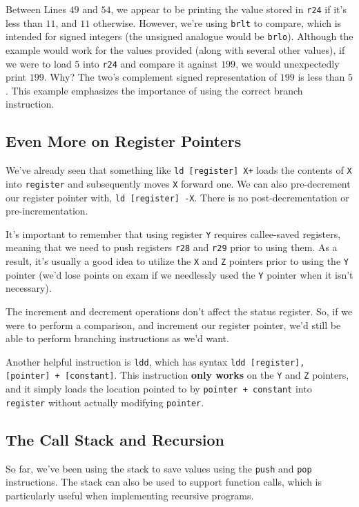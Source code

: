 Between Lines $49$ and $54$, we appear to be printing the value stored in \verb!r24! if it's less than $11$, and $11$ otherwise. However, we're using \verb!brlt! to compare, which is intended for signed integers (the unsigned analogue would be \verb!brlo!). Although the example would work for the values provided (along with several other values), if we were to load $5$ into \verb!r24! and compare it against $199$, we would unexpectedly print $199$. Why? The two's complement signed representation of $199$ is less than $5$. This example emphasizes the importance of using the correct branch instruction. 


\subsection{Even More on Register Pointers}

We've already seen that something like \verb!ld [register] X+! loads the contents of \verb!X! into \verb!register! and subsequently moves \verb!X! forward one. We can also pre-decrement our register pointer with, \verb!ld [register] -X!. There is no post-decrementation or pre-incrementation.

It's important to remember that using register \verb!Y! requires callee-saved registers, meaning that we need to push registers \verb!r28! and \verb!r29! prior to using them. As a result, it's usually a good idea to utilize the \verb!X! and \verb!Z! pointers prior to using the \verb!Y! pointer (we'd lose points on exam if we needlessly used the \verb!Y! pointer when it isn't necessary).


The increment and decrement operations don't affect the status register. So, if we were to perform a comparison, and increment our register pointer, we'd still be able to perform branching instructions as we'd want.


Another helpful instruction is \verb!ldd!, which has syntax \verb!ldd [register], [pointer] + [constant]!. This instruction \textbf{only works} on the \verb!Y! and \verb!Z! pointers, and it simply loads the location pointed to by \verb!pointer + constant! into \verb!register! without actually modifying \verb!pointer!. 


\subsection{The Call Stack and Recursion}
So far, we've been using the stack to save values using the \verb!push! and \verb!pop! instructions. The stack can also be used to support function calls, which is particularly useful when implementing recursive programs.


